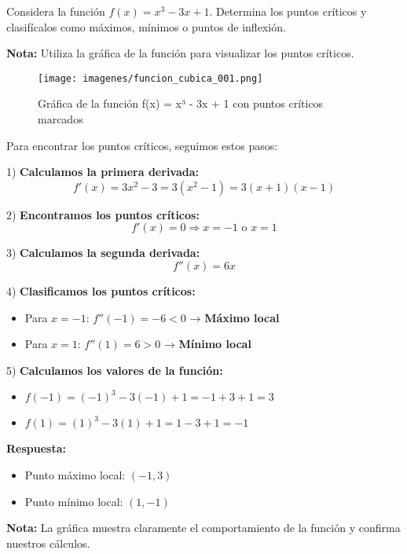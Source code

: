 \begin{ejercicio}[
  id=CAL_FUN_001,
  materia=calculo,
  capitulo=funciones,
  nivel=intermedio,
  procedencia="Libro Cálculo Avanzado",
  visibilidad=true,
  libros={calculo1, calculo_avanzado},
  youtube_url="https://www.youtube.com/watch?v=ejemplo_calculo",
  mostrar_solucion=true,
  libro_promocion=""
]
Considera la función $f(x) = x^3 - 3x + 1$. Determina los puntos críticos y clasifícalos como máximos, mínimos o puntos de inflexión.

\textbf{Nota:} Utiliza la gráfica de la función para visualizar los puntos críticos.

\begin{figure}[h]
\centering
\texttt{[image: imagenes/funcion\_cubica\_001.png]}
\caption{Gráfica de la función f(x) = x³ - 3x + 1 con puntos críticos marcados}
\label{fig:funcion_cubica}
\end{figure}

\begin{solucion}
Para encontrar los puntos críticos, seguimos estos pasos:

1) \textbf{Calculamos la primera derivada:}
   $$f'(x) = 3x^2 - 3 = 3(x^2 - 1) = 3(x+1)(x-1)$$

2) \textbf{Encontramos los puntos críticos:}
   $$f'(x) = 0 \Rightarrow x = -1 \text{ o } x = 1$$

3) \textbf{Calculamos la segunda derivada:}
   $$f''(x) = 6x$$

4) \textbf{Clasificamos los puntos críticos:}
   \begin{itemize}
   \item Para $x = -1$: $f''(-1) = -6 < 0$ → \textbf{Máximo local}
   \item Para $x = 1$: $f''(1) = 6 > 0$ → \textbf{Mínimo local}
   \end{itemize}

5) \textbf{Calculamos los valores de la función:}
   \begin{itemize}
   \item $f(-1) = (-1)^3 - 3(-1) + 1 = -1 + 3 + 1 = 3$
   \item $f(1) = (1)^3 - 3(1) + 1 = 1 - 3 + 1 = -1$
   \end{itemize}

\textbf{Respuesta:}
\begin{itemize}
\item Punto máximo local: $(-1, 3)$
\item Punto mínimo local: $(1, -1)$
\end{itemize}

\textbf{Nota:} La gráfica muestra claramente el comportamiento de la función y confirma nuestros cálculos.
\end{solucion}
\end{ejercicio} 